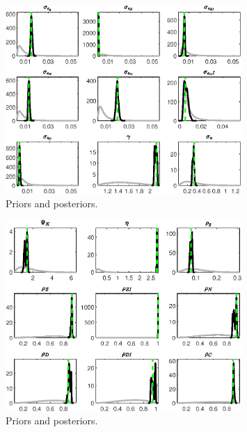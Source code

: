  
\begin{figure}[H]
\centering
\includegraphics[width=0.80\textwidth]{BRS_growth_util/Output/BRS_growth_util_PriorsAndPosteriors1}
\caption{Priors and posteriors.}\label{Fig:PriorsAndPosteriors:1}
\end{figure}
 
\begin{figure}[H]
\centering
\includegraphics[width=0.80\textwidth]{BRS_growth_util/Output/BRS_growth_util_PriorsAndPosteriors2}
\caption{Priors and posteriors.}\label{Fig:PriorsAndPosteriors:2}
\end{figure}
 
